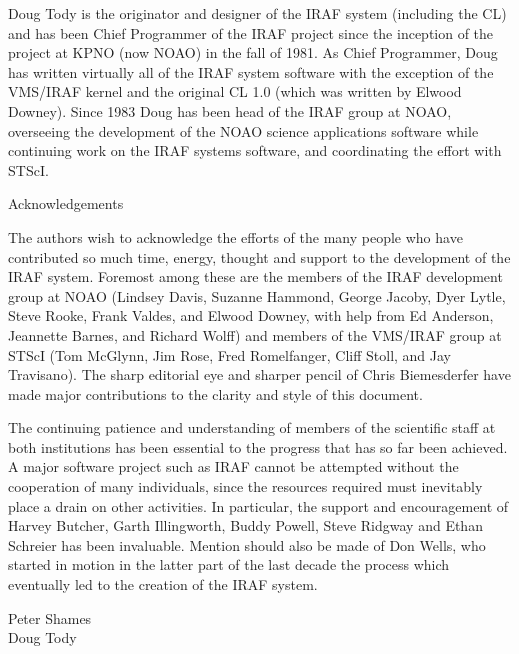 \vskip 0.5cm
\noindent
Doug Tody is the originator and designer of the IRAF system (including the CL)
and has been Chief Programmer of the IRAF project since the inception of the
project at KPNO (now NOAO) in the fall of 1981.  As Chief Programmer, Doug has
written virtually all of the IRAF system software with the exception of the
VMS/IRAF kernel and the original CL 1.0 (which was written by Elwood Downey).
Since 1983 Doug has been head of the IRAF group at NOAO, overseeing the
development of the NOAO science applications software while continuing work
on the IRAF systems software, and coordinating the effort with STScI.

\newpage
\thispagestyle{empty}

\begin{center} \vspace*{1in}
\large Acknowledgements
\end{center}
\vskip 1cm
\rm

\noindent
The authors wish to acknowledge the efforts of the many people who have 
contributed so much time, energy, thought and support to the development 
of the IRAF system.  Foremost among these are the members of the IRAF
development group at NOAO (Lindsey Davis, Suzanne Hammond, George Jacoby,
Dyer Lytle, Steve Rooke, Frank Valdes, and Elwood Downey, with help from
Ed Anderson, Jeannette Barnes, and Richard Wolff) and members of the VMS/IRAF
group at STScI (Tom McGlynn, Jim Rose, Fred Romelfanger, Cliff Stoll,
and Jay Travisano).  The sharp editorial eye and sharper pencil of
Chris Biemesderfer have made major contributions to the clarity and style
of this document.

\vskip 0.3cm
\noindent
The continuing patience and understanding of members of the scientific
staff at both institutions has been essential to the progress that has
so far been achieved.  A major software project such as IRAF cannot
be attempted without the cooperation of many individuals, since the
resources required must inevitably place a drain on other activities.
In particular, the support and encouragement of Harvey Butcher,
Garth Illingworth, Buddy Powell, Steve Ridgway and Ethan Schreier has
been invaluable.  Mention should also be made of Don Wells, who started
in motion in the latter part of the last decade the process which eventually
led to the creation of the IRAF system.

\begin{flushright}
Peter Shames \\
Doug Tody 
\end{flushright}


